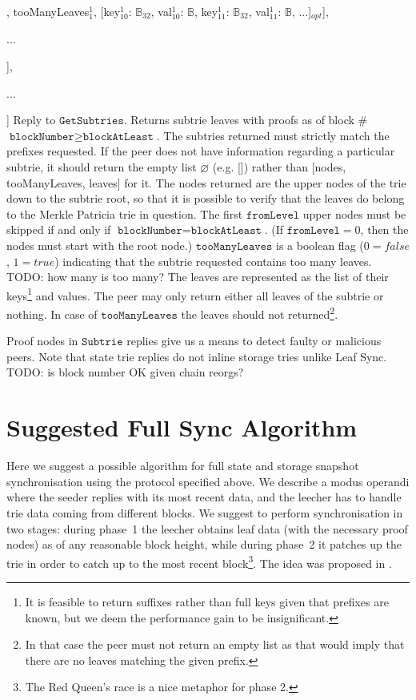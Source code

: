 \documentclass{amsart}
\begin{document}
\qquad [[node$^1_{10}$: $\mathbb{B}$, node$^1_{11}$: $\mathbb{B}$, ...], tooManyLeaves$^1_1$, [key$^1_{10}$: $\mathbb{B}_{32}$, val$^1_{10}$: $\mathbb{B}$, key$^1_{11}$: $\mathbb{B}_{32}$, val$^1_{11}$: $\mathbb{B}$, ...]$_{opt}$],

\qquad ...

\quad ],

\quad ...

] Reply to $\texttt{GetSubtries}$.
Returns subtrie leaves with proofs as of block \#$\texttt{blockNumber} \geq \texttt{blockAtLeast}$.
The subtries returned must strictly match the prefixes requested.
If the peer does not have information regarding a particular subtrie, it should return the empty list $\varnothing$ (e.g. []) rather than [nodes, tooManyLeaves, leaves] for it.
The nodes returned are the upper nodes of the trie down to the subtrie root, so that it is possible to verify that the leaves do belong to the Merkle Patricia trie in question.
The first $\texttt{fromLevel}$ upper nodes must be skipped if and only if $\texttt{blockNumber} = \texttt{blockAtLeast}$.
(If $\texttt{fromLevel} = 0$, then the nodes must start with the root node.)
$\texttt{tooManyLeaves}$ is a boolean flag ($0=false$, $1=true$) indicating that the subtrie requested contains too many leaves.
TODO: how many is too many?
The leaves are represented as the list of their keys\footnote{It
is feasible to return suffixes rather than full keys given that prefixes are known, but we deem the performance gain to be insignificant.}
and values.
The peer may only return either all leaves of the subtrie or nothing.
In case of $\texttt{tooManyLeaves}$ the leaves should not returned\footnote{In
that case the peer must not return an empty list as that would imply that there are no leaves matching the given prefix.}.

Proof nodes in $\texttt{Subtrie}$ replies give us a means to detect faulty or malicious peers.
Note that state trie replies do not inline storage tries unlike Leaf Sync.\\

TODO: is block number OK given chain reorgs?

\section{Suggested Full Sync Algorithm}

Here we suggest a possible algorithm for full state and storage snapshot synchronisation using the protocol specified above.
We describe a modus operandi where the seeder replies with its most recent data,
and the leecher has to handle trie data coming from different blocks.
We suggest to perform synchronisation in two stages:
during phase~1 the leecher obtains leaf data (with the necessary proof nodes) as of any reasonable block height,
while during phase~2 it patches up the trie in order to catch up to the most recent block\footnote{The
Red Queen's race is a nice metaphor for phase 2.}.
The idea was proposed in \cite{leaf_sync}.
\end{document}
